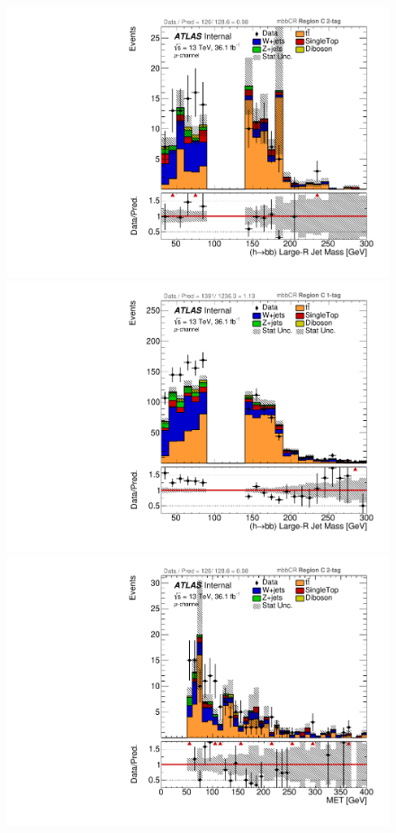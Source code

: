 \begin{figure}[!htbp]
\begin{center}
\includegraphics[scale=0.33]{./figures/boosted/ABCD_ScaledPrompt/muon_mbbcr_RegionC_HbbMass}
\includegraphics[scale=0.33]{./figures/boosted/ABCD_ScaledPrompt/muon_mbbcr_RegionC_1tag_HbbMass}\\
\includegraphics[scale=0.33]{./figures/boosted/ABCD_ScaledPrompt/muon_mbbcr_RegionC_MET}

\end{center}
\end{figure}
